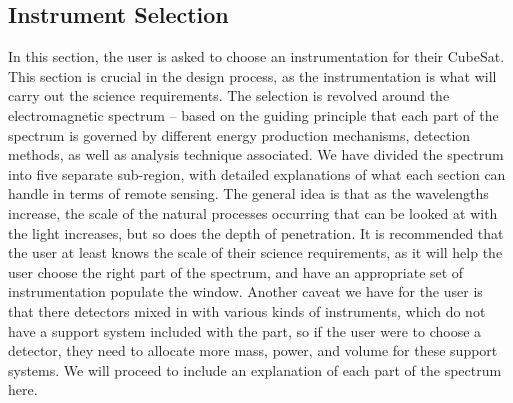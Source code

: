 \documentclass[a4, 12 pt]{article} %
\begin{document}
\subsection{Instrument Selection}
In this section, the user is asked to choose an instrumentation for their CubeSat. This section is crucial in the design process, as the instrumentation is what will carry out the science requirements. The selection is revolved around the electromagnetic spectrum -- based on the guiding principle that each part of the spectrum is governed by different energy production mechanisms, detection methods, as well as analysis technique associated. We have divided the spectrum into five separate sub-region, with detailed explanations of what each section can handle in terms of remote sensing. The general idea is that as the wavelengths increase, the scale of the natural processes occurring that can be looked at with the light increases, but so does the depth of penetration. It is recommended that the user at least knows the scale of their science requirements, as it will help the user choose the right part of the spectrum, and have an appropriate set of instrumentation populate the window. Another caveat we have for the user is that there detectors mixed in with various kinds of instruments, which do not have a support system included with the part, so if the user were to choose a detector, they need to allocate more mass, power, and volume for these support systems. We will proceed to include an explanation of each part of the spectrum here.
\end{document}
